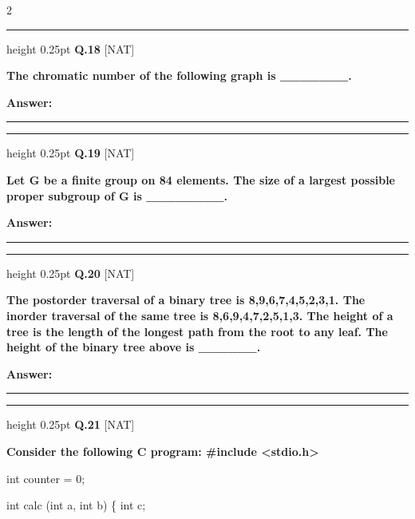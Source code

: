 \documentclass[a4paper,10pt,twoside]{article}
\begin{document}
\begin{multicols}{2}
\par\vspace{6pt}\hrule height 0.25pt\vspace{6pt}
\noindent\textbf{Q.18} \hfill {\footnotesize\textsf{[NAT]}}
\par\vspace{2pt}
{\bfseries The chromatic number of the following graph is \_\_\_\_\_\_\_. \par}
\par\vspace{3pt}\noindent\textbf{Answer:} \rule{3.2cm}{0.4pt}
\par\vspace{6pt}\hrule height 0.25pt\vspace{6pt}
\noindent\textbf{Q.19} \hfill {\footnotesize\textsf{[NAT]}}
\par\vspace{2pt}
{\bfseries Let G be a finite group on 84 elements. The size of a largest possible proper subgroup of G
is \_\_\_\_\_\_\_\_. \par}
\par\vspace{3pt}\noindent\textbf{Answer:} \rule{3.2cm}{0.4pt}
\par\vspace{6pt}\hrule height 0.25pt\vspace{6pt}
\noindent\textbf{Q.20} \hfill {\footnotesize\textsf{[NAT]}}
\par\vspace{2pt}
{\bfseries The postorder traversal of a binary tree is 8,9,6,7,4,5,2,3,1. The inorder traversal of the same
tree is 8,6,9,4,7,2,5,1,3. The height of a tree is the length of the longest path from the root to
any leaf. The height of the binary tree above is \_\_\_\_\_\_. \par}
\par\vspace{3pt}\noindent\textbf{Answer:} \rule{3.2cm}{0.4pt}
\par\vspace{6pt}\hrule height 0.25pt\vspace{6pt}
\noindent\textbf{Q.21} \hfill {\footnotesize\textsf{[NAT]}}
\par\vspace{2pt}
{\bfseries Consider the following C program:
\#include <stdio.h>
\par\smallskip
int counter = 0;
\par\smallskip
int calc (int a, int b) \{
int c;
\par\smallskip
}
\end{multicols}
\end{document}

